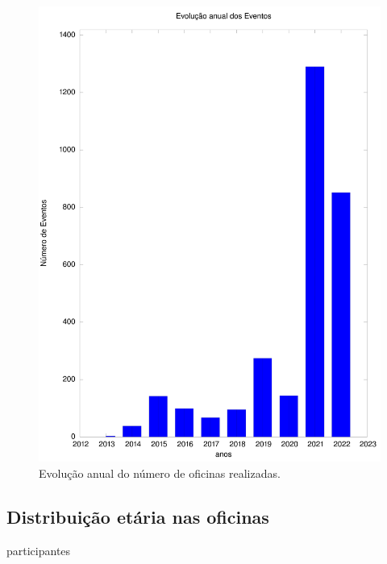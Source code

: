 \documentclass[
12pt,		%
openright,	%
twoside,  %
a4paper,			%
chapter=TITLE,		%
english,			%
french,				%
spanish,			%
brazil				%
]{USPSC-classe/USPSC_RedarTex}
\begin{document}
\captionsetup{format=plain}
\begin{figure}[Htb]

	\begin{center}

		\includegraphics[max size={\textwidth}]{../../imagens/output-eventos.jpeg}

	\end{center}

	\caption{\label{8af5236ba8f91623157f8f95ae10366b416d6049}Evolu\c{c}\~ao anual do n\'umero de oficinas realizadas.}

\end{figure}

\subsection[Distribui\c{c}\~ao et\'aria nas oficinas]{Distribui\c{c}\~ao et\'aria nas oficinas}\label{Distribui\c{c}\~ao et\'aria nas oficinas}
participantes
\end{document}
